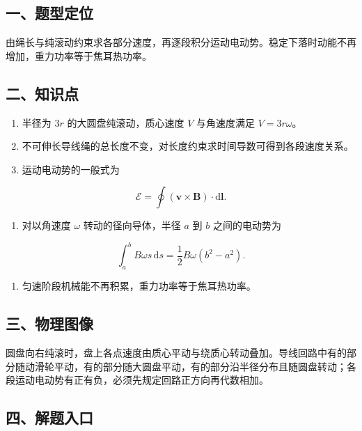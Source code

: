 \documentclass[12pt,a4paper,UTF8]{ctexart}
\newcommand{\tightlist}{\setlength{\itemsep}{0pt}\setlength{\parskip}{0pt}}
\begin{document}
\subsection{一、题型定位}\label{ux4e00ux9898ux578bux5b9aux4f4d-4}

由绳长与纯滚动约束求各部分速度，再逐段积分运动电动势。稳定下落时动能不再增加，重力功率等于焦耳热功率。

\subsection{二、知识点}\label{ux4e8cux77e5ux8bc6ux70b9-4}

\begin{enumerate}
\def\labelenumi{\arabic{enumi}.}
\tightlist
\item
  半径为 \(3r\) 的大圆盘纯滚动，质心速度 \(V\) 与角速度满足
  \(V=3r\omega\)。
\item
  不可伸长导线绳的总长度不变，对长度约束求时间导数可得到各段速度关系。
\item
  运动电动势的一般式为
\end{enumerate}

\[\mathcal E=\oint(\bm v\times\bm B)\cdot\mathrm d\bm l.\]

\begin{enumerate}
\def\labelenumi{\arabic{enumi}.}
\setcounter{enumi}{3}
\tightlist
\item
  对以角速度 \(\omega\) 转动的径向导体，半径 \(a\) 到 \(b\)
  之间的电动势为
\end{enumerate}

\[\int_a^bB\omega s\,\mathrm ds=\frac12B\omega(b^2-a^2).\]

\begin{enumerate}
\def\labelenumi{\arabic{enumi}.}
\setcounter{enumi}{4}
\tightlist
\item
  匀速阶段机械能不再积累，重力功率等于焦耳热功率。
\end{enumerate}

\subsection{三、物理图像}\label{ux4e09ux7269ux7406ux56feux50cf-4}

圆盘向右纯滚时，盘上各点速度由质心平动与绕质心转动叠加。导线回路中有的部分随动滑轮平动，有的部分随大圆盘平动，有的部分沿半径分布且随圆盘转动；各段运动电动势有正有负，必须先规定回路正方向再代数相加。

\subsection{四、解题入口}\label{ux56dbux89e3ux9898ux5165ux53e3-4}
\end{document}
